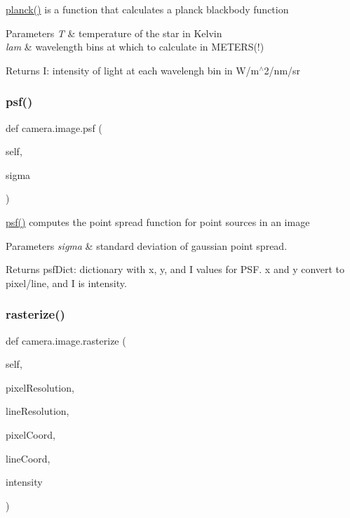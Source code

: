 \hyperlink{classcamera_1_1image_a9ea76ebff6206130cfbbe8e45fcf0ca6}{planck()} is a function that calculates a planck blackbody function 


\begin{DoxyParams}{Parameters}
{\em T} & temperature of the star in Kelvin \\
\hline
{\em lam} & wavelength bins at which to calculate in M\+E\+T\+E\+RS(!) \\
\hline
\end{DoxyParams}
\begin{DoxyReturn}{Returns}
I\+: intensity of light at each wavelengh bin in W/m$^\wedge$2/nm/sr 
\end{DoxyReturn}
\mbox{\label{classcamera_1_1image_a20565a1c8ab7898a047e45ca6edf2b1b}} 
\subsubsection{\texorpdfstring{psf()}{psf()}}
{\footnotesize\ttfamily def camera.\+image.\+psf (\begin{DoxyParamCaption}\item[{}]{self,  }\item[{}]{sigma }\end{DoxyParamCaption})}



\hyperlink{classcamera_1_1image_a20565a1c8ab7898a047e45ca6edf2b1b}{psf()} computes the point spread function for point sources in an image 


\begin{DoxyParams}{Parameters}
{\em sigma} & standard deviation of gaussian point spread. \\
\hline
\end{DoxyParams}
\begin{DoxyReturn}{Returns}
psf\+Dict\+: dictionary with x, y, and I values for P\+SF. x and y convert to pixel/line, and I is intensity. 
\end{DoxyReturn}
\mbox{\label{classcamera_1_1image_ac6c6e628859396da903359da425f8fbb}} 
\subsubsection{\texorpdfstring{rasterize()}{rasterize()}}
{\footnotesize\ttfamily def camera.\+image.\+rasterize (\begin{DoxyParamCaption}\item[{}]{self,  }\item[{}]{pixel\+Resolution,  }\item[{}]{line\+Resolution,  }\item[{}]{pixel\+Coord,  }\item[{}]{line\+Coord,  }\item[{}]{intensity }\end{DoxyParamCaption})}



